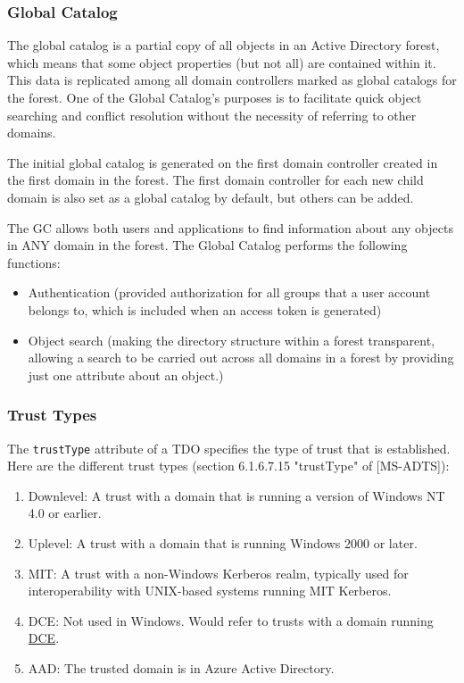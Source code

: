 \subsubsection{Global Catalog}

The global catalog is a partial copy of all objects in an Active Directory forest, which means that some object properties (but not all) are contained within it. This data is replicated among all domain controllers marked as global catalogs for the forest. One of the Global Catalog's purposes is to facilitate quick object searching and conflict resolution without the necessity of referring to other domains.

The initial global catalog is generated on the first domain controller created in the first domain in the forest. The first domain controller for each new child domain is also set as a global catalog by default, but others can be added.

The GC allows both users and applications to find information about any objects in ANY domain in the forest. The Global Catalog performs the following functions:
\begin{itemize}
    \item Authentication (provided authorization for all groups that a user account belongs to, which is included when an access token is generated)
    \item Object search (making the directory structure within a forest transparent, allowing a search to be carried out across all domains in a forest by providing just one attribute about an object.)
\end{itemize}

\subsubsection{Trust Types}

The \verb|trustType| attribute of a TDO specifies the type of trust that is established. Here are the different trust types (section 6.1.6.7.15 "trustType" of [MS-ADTS]):

\begin{enumerate}
    \item Downlevel: A trust with a domain that is running a version of Windows NT 4.0 or earlier.
    \item Uplevel: A trust with a domain that is running Windows 2000 or later.
    \item MIT: A trust with a non-Windows Kerberos realm, typically used for interoperability with UNIX-based systems running MIT Kerberos.
    \item DCE: Not used in Windows. Would refer to trusts with a domain running \href{http://www.opengroup.org/dce/info/}{DCE}.
    \item AAD: The trusted domain is in Azure Active Directory.
\end{enumerate}

